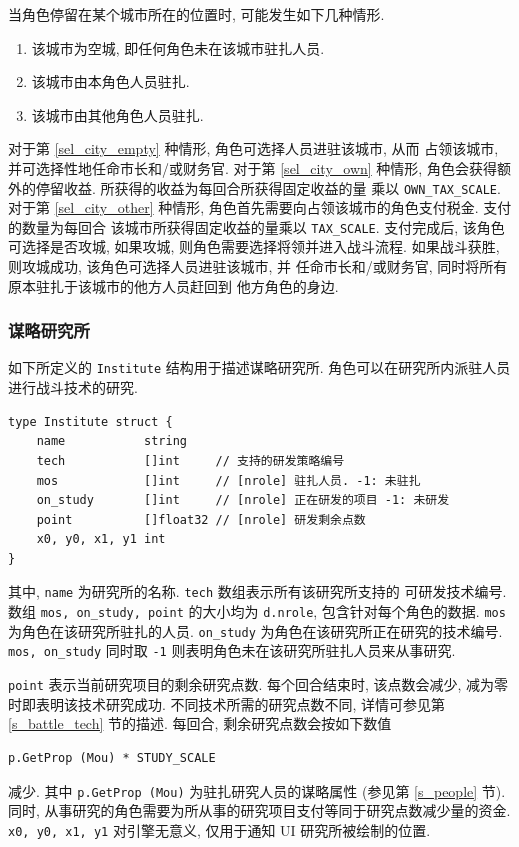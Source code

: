 \documentclass[UTF8, zihao=-4]{ctexart} %
\newcommand{\lcode}{\lstinline} % 段内插入代码
\begin{document}
当角色停留在某个城市所在的位置时, 可能发生如下几种情形.
\begin{enumerate}
      \item \label{sel_city_empty}该城市为空城, 即任何角色未在该城市驻扎人员.
      \item \label{sel_city_own}该城市由本角色人员驻扎.
      \item \label{sel_city_other}该城市由其他角色人员驻扎.
\end{enumerate}
对于第 \ref{sel_city_empty} 种情形, 角色可选择人员进驻该城市, 从而
占领该城市, 并可选择性地任命市长和/或财务官. 对于第 \ref{sel_city_own} 
种情形, 角色会获得额外的停留收益. 所获得的收益为每回合所获得固定收益的量
乘以 \lcode{OWN_TAX_SCALE}. 对于第 \ref{sel_city_other} 种情形,
角色首先需要向占领该城市的角色支付税金. 支付的数量为每回合
该城市所获得固定收益的量乘以 \lcode{TAX_SCALE}. 支付完成后,
该角色可选择是否攻城, 如果攻城, 则角色需要选择将领并进入战斗流程.
如果战斗获胜, 则攻城成功, 该角色可选择人员进驻该城市, 并
任命市长和/或财务官, 同时将所有原本驻扎于该城市的他方人员赶回到
他方角色的身边.

\subsubsection{谋略研究所}
如下所定义的 \lcode{Institute} 结构用于描述谋略研究所.
角色可以在研究所内派驻人员进行战斗技术的研究.
\begin{lstlisting}
type Institute struct {
	name           string
	tech           []int     // 支持的研发策略编号
	mos            []int     // [nrole] 驻扎人员. -1: 未驻扎
	on_study       []int     // [nrole] 正在研发的项目 -1: 未研发
	point          []float32 // [nrole] 研发剩余点数
	x0, y0, x1, y1 int
}
\end{lstlisting}
其中, \lcode{name} 为研究所的名称. \lcode{tech} 数组表示所有该研究所支持的
可研发技术编号. 数组 \lcode{mos, on_study, point} 的大小均为 \lcode{d.nrole},
包含针对每个角色的数据. \lcode{mos} 为角色在该研究所驻扎的人员.
\lcode{on_study} 为角色在该研究所正在研究的技术编号. \lcode{mos, on_study} 同时取 \lcode{-1}
则表明角色未在该研究所驻扎人员来从事研究.

\lcode{point} 表示当前研究项目的剩余研究点数. 每个回合结束时, 该点数会减少, 减为零时即表明该技术研究成功.
不同技术所需的研究点数不同, 详情可参见第 \ref{s_battle_tech} 节的描述.
每回合, 剩余研究点数会按如下数值
\begin{lstlisting}
p.GetProp (Mou) * STUDY_SCALE
\end{lstlisting}
减少. 其中 \lcode{p.GetProp (Mou)} 为驻扎研究人员的谋略属性 (参见第 \ref{s_people} 节).
同时, 从事研究的角色需要为所从事的研究项目支付等同于研究点数减少量的资金.
\lcode{x0, y0, x1, y1} 对引擎无意义, 仅用于通知 UI 研究所被绘制的位置.
\end{document}
